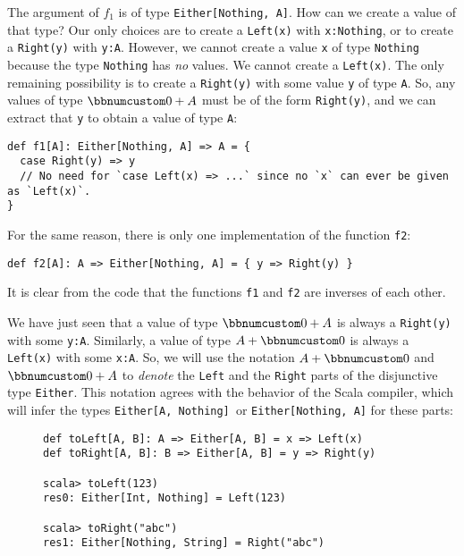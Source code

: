 The argument of $f_{1}$ is of type \lstinline!Either[Nothing, A]!.
How can we create a value of that type? Our only choices are to create
a \lstinline!Left(x)! with \lstinline!x:Nothing!, or to create a
\lstinline!Right(y)! with \lstinline!y:A!. However, we cannot create
a value \lstinline!x! of type \lstinline!Nothing! because the type
\lstinline!Nothing! has \emph{no} values. We cannot create a \lstinline!Left(x)!.
The only remaining possibility is to create a \lstinline!Right(y)!
with some value \lstinline!y! of type \lstinline!A!. So, any values
of type $\bbnum 0+A$ must be of the form \lstinline!Right(y)!, and
we can extract that \lstinline!y! to obtain a value of type \lstinline!A!:
\begin{lstlisting}
def f1[A]: Either[Nothing, A] => A = {
  case Right(y) => y
  // No need for `case Left(x) => ...` since no `x` can ever be given as `Left(x)`.
}
\end{lstlisting}
For the same reason, there is only one implementation of the function
\lstinline!f2!:
\begin{lstlisting}
def f2[A]: A => Either[Nothing, A] = { y => Right(y) }
\end{lstlisting}
It is clear from the code that the functions \lstinline!f1! and \lstinline!f2!
are inverses of each other.

We have just seen that a value of type $\bbnum 0+A$ is always a \lstinline!Right(y)!
with some \lstinline!y:A!. Similarly, a value of type $A+\bbnum 0$
is always a \lstinline!Left(x)! with some \lstinline!x:A!. So, we
will use the notation $A+\bbnum 0$ and $\bbnum 0+A$ to \emph{denote}
the \lstinline!Left! and the \lstinline!Right! parts of the disjunctive
type \lstinline!Either!. This notation agrees with the behavior of
the Scala compiler, which will infer the types \lstinline!Either[A, Nothing] !or
\lstinline!Either[Nothing, A]! for these parts:

\begin{wrapfigure}{l}{0.53\columnwidth}%
\vspace{-0.6\baselineskip}
\begin{lstlisting}
def toLeft[A, B]: A => Either[A, B] = x => Left(x)
def toRight[A, B]: B => Either[A, B] = y => Right(y)

scala> toLeft(123)
res0: Either[Int, Nothing] = Left(123)

scala> toRight("abc")
res1: Either[Nothing, String] = Right("abc")
\end{lstlisting}

\vspace{-2\baselineskip}
\end{wrapfigure}%

